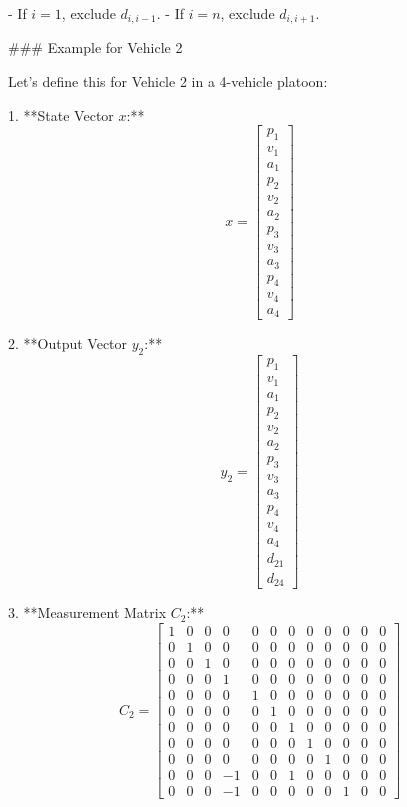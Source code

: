\documentclass[letterpaper, 10pt, conference]{ieeeconf}  %
\begin{document}
   - If \( i = 1 \), exclude \( d_{i, i-1} \).
   - If \( i = n \), exclude \( d_{i, i+1} \).

### Example for Vehicle 2

Let's define this for Vehicle 2 in a 4-vehicle platoon:

1. **State Vector \( x \):**
   \[
   x = \begin{bmatrix}
   p_1 \\ v_1 \\ a_1 \\ p_2 \\ v_2 \\ a_2 \\ p_3 \\ v_3 \\ a_3 \\ p_4 \\ v_4 \\ a_4
   \end{bmatrix}
   \]

2. **Output Vector \( y_2 \):**
   \[
   y_2 = \begin{bmatrix}
   p_1 \\ v_1 \\ a_1 \\ p_2 \\ v_2 \\ a_2 \\ p_3 \\ v_3 \\ a_3 \\ p_4 \\ v_4 \\ a_4 \\ d_{21} \\ d_{24}
   \end{bmatrix}
   \]

3. **Measurement Matrix \( C_2 \):**
   \[
   C_2 = \begin{bmatrix}
   1 & 0 & 0 & 0 & 0 & 0 & 0 & 0 & 0 & 0 & 0 & 0 \\
   0 & 1 & 0 & 0 & 0 & 0 & 0 & 0 & 0 & 0 & 0 & 0 \\
   0 & 0 & 1 & 0 & 0 & 0 & 0 & 0 & 0 & 0 & 0 & 0 \\
   0 & 0 & 0 & 1 & 0 & 0 & 0 & 0 & 0 & 0 & 0 & 0 \\
   0 & 0 & 0 & 0 & 1 & 0 & 0 & 0 & 0 & 0 & 0 & 0 \\
   0 & 0 & 0 & 0 & 0 & 1 & 0 & 0 & 0 & 0 & 0 & 0 \\
   0 & 0 & 0 & 0 & 0 & 0 & 1 & 0 & 0 & 0 & 0 & 0 \\
   0 & 0 & 0 & 0 & 0 & 0 & 0 & 1 & 0 & 0 & 0 & 0 \\
   0 & 0 & 0 & 0 & 0 & 0 & 0 & 0 & 1 & 0 & 0 & 0 \\
   0 & 0 & 0 & -1 & 0 & 0 & 1 & 0 & 0 & 0 & 0 & 0 \\
   0 & 0 & 0 & -1 & 0 & 0 & 0 & 0 & 0 & 1 & 0 & 0
   \end{bmatrix}
   \]
\end{document}
